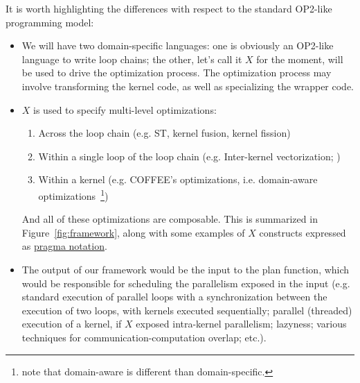 \documentclass[a4paper]{article}
\begin{document}
It is worth highlighting the differences with respect to the standard OP2-like programming model:
\begin{itemize}
\item We will have two domain-specific languages: one is obviously an OP2-like language to write loop chains; the other, let's call it $X$ for the moment, will be used to drive the optimization process. The optimization process may involve transforming the kernel code, as well as specializing the wrapper code.
\item $X$ is used to specify multi-level optimizations:
	\begin{enumerate}
	\item Across the loop chain (e.g. ST, kernel fusion, kernel fission)
	\item Within a single loop of the loop chain (e.g. Inter-kernel vectorization; )
	\item Within a kernel (e.g. COFFEE's optimizations, i.e. domain-aware optimizations~\footnote{note that domain-aware is different than domain-specific.})
	\end{enumerate}
	And all of these optimizations are composable. This is summarized in Figure~\ref{fig:framework}, along with some examples of $X$ constructs expressed as \ul{pragma notation}. 
\item The output of our framework would be the input to the plan function, which would be responsible for scheduling the parallelism exposed in the input (e.g. standard execution of parallel loops with a synchronization between the execution of two loops, with kernels executed sequentially; parallel (threaded) execution of a kernel, if $X$ exposed intra-kernel parallelism; lazyness; various techniques for communication-computation overlap; etc.). 
\end{itemize}
\end{document}

